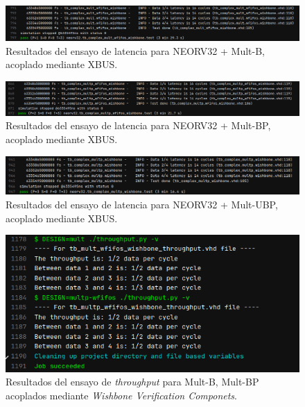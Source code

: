 \begin{figure}[H]
    \centering
    \includegraphics[width=14cm]{Figuras/result/lat6.png}
    \caption{Resultados del ensayo de latencia para NEORV32 + Mult-B, acoplado mediante XBUS.}
    \label{fig:lat6}
\end{figure}

\begin{figure}[H]
    \centering
    \includegraphics[width=14cm]{Figuras/result/lat7.png}
    \caption{Resultados del ensayo de latencia para NEORV32 + Mult-BP, acoplado mediante XBUS.}
    \label{fig:lat7}
\end{figure}

\begin{figure}[H]
    \centering
    \includegraphics[width=14cm]{Figuras/result/lat8.png}
    \caption{Resultados del ensayo de latencia para NEORV32 + Mult-UBP, acoplado mediante XBUS.}
    \label{fig:lat8}
\end{figure}

\begin{figure}[H]
    \centering
    \includegraphics[width=14cm]{Figuras/result/thr5.png}
    \caption{Resultados del ensayo de \textit{throughput} para Mult-B, Mult-BP acoplados mediante \textit{Wishbone Verification Componets}.}
    \label{fig:thr5}
\end{figure}

